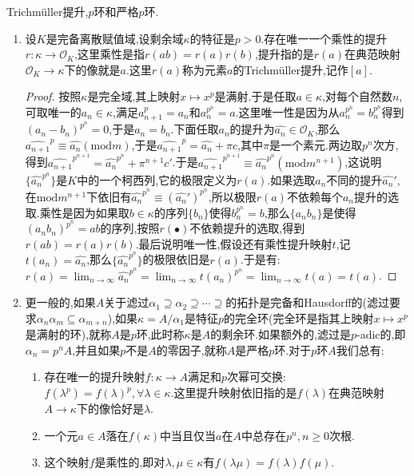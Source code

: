 Trichm\"uller提升,$p$环和严格$p$环.
\begin{enumerate}
	\item 设$K$是完备离散赋值域,设剩余域$\kappa$的特征是$p>0$.存在唯一一个乘性的提升$r:\kappa\to\mathscr{O}_K$,这里乘性是指$r(ab)=r(a)r(b)$,提升指的是$r(a)$在典范映射$\mathscr{O}_K\to\kappa$下的像就是$a$.这里$r(a)$称为元素$a$的Trichm\"uller提升,记作$[a]$.
	\begin{proof}
		
		按照$\kappa$是完全域,其上映射$x\mapsto x^p$是满射.于是任取$a\in\kappa$,对每个自然数$n$,可取唯一的$a_n\in\kappa$,满足$a_{n+1}^p=a_n$和$a_n^{p^n}=a$.这里唯一性是因为从$a_n^{p^n}=b_n^{p^n}$得到$(a_n-b_n)^{p^n}=0$,于是$a_n=b_n$.下面任取$a_n$的提升为$\widehat{a_n}\in\mathscr{O}_K$,那么$\widehat{a_{n+1}}^p\equiv\widehat{a_n}(\mathrm{mod}m)$,于是$\widehat{a_{n+1}}^p=\widehat{a_n}+\pi c$,其中$\pi$是一个素元.两边取$p^n$次方,得到$\widehat{a_{n+1}}^{p^{n+1}}=\widehat{a_n}^{p^n}+\pi^{n+1}c'$.于是$\widehat{a_{n+1}}^{p^{n+1}}\equiv\widehat{a_n}^{p^n}(\mathrm{mod}m^{n+1})$,这说明$\{\widehat{a_n}^{p^n}\}$是$K$中的一个柯西列,它的极限定义为$r(a)$.如果选取$a_n$不同的提升$\widehat{a_n}'$,在$\mathrm{mod}m^{n+1}$下依旧有$\widehat{a_n}^{p^n}\equiv(\widehat{a_n}')^{p^n}$,所以极限$r(a)$不依赖每个$a_n$提升的选取.乘性是因为如果取$b\in\kappa$的序列$\{b_n\}$使得$b_n^{p^n}=b$,那么$\{a_nb_n\}$是使得$(a_nb_n)^{p^n}=ab$的序列,按照$r(\bullet)$不依赖提升的选取,得到$r(ab)=r(a)r(b)$.最后说明唯一性,假设还有乘性提升映射$t$,记$t(a_n)=\widehat{a_n}$,那么$\{\widehat{a_n}^{p^n}\}$的极限依旧是$r(a)$.于是有:$r(a)=\lim_{n\to\infty}\widehat{a_n}^{p^n}=\lim_{n\to\infty}t(a_n)^{p^n}=\lim_{n\to\infty}t(a)=t(a)$.
	\end{proof}
    \item 更一般的,如果$A$关于滤过$\alpha_1\supseteq\alpha_2\supseteq\cdots\supseteq$的拓扑是完备和Hausdorff的(滤过要求$\alpha_n\alpha_m\subseteq\alpha_{m+n}$),如果$\kappa=A/\alpha_1$是特征$p$的完全环(完全环是指其上映射$x\mapsto x^p$是满射的环),就称$A$是$p$环,此时称$\kappa$是$A$的剩余环.如果额外的,滤过是$p$-adic的,即$\alpha_n=p^nA$,并且如果$p$不是$A$的零因子,就称$A$是严格$p$环.对于$p$环$A$我们总有:
    \begin{enumerate}
    	\item 存在唯一的提升映射$f:\kappa\to A$满足和$p$次幂可交换:$f(\lambda^p)=f(\lambda)^p,\forall\lambda\in\kappa$.这里提升映射依旧指的是$f(\lambda)$在典范映射$A\to\kappa$下的像恰好是$\lambda$.
    	\item 一个元$a\in A$落在$f(\kappa)$中当且仅当$a$在$A$中总存在$p^n,n\ge0$次根.
    	\item 这个映射$f$是乘性的,即对$\lambda,\mu\in\kappa$有$f(\lambda\mu)=f(\lambda)f(\mu)$.

\end{enumerate}
\end{enumerate}
